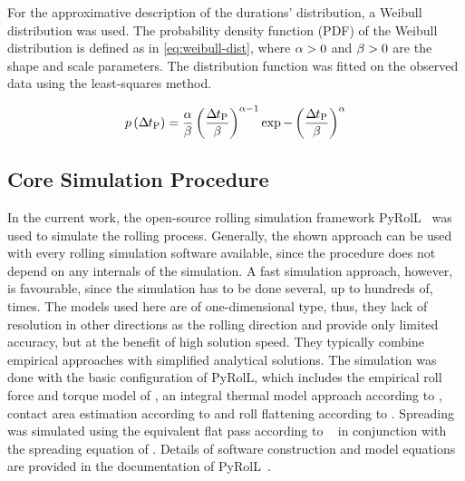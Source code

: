 For the approximative description of the durations' distribution, a Weibull distribution was used.
The probability density function (PDF) of the Weibull distribution is defined as in \autoref{eq:weibull-dist},
where ${\alpha} > 0$ and ${\beta} > 0$ are the shape and scale parameters.
The distribution function was fitted on the observed data using the least-squares method.

\begin{equation}
    p\left({{\Delta\mspace{-1mu}t}_\mathrm{P}} \right)=\frac{{\alpha}}{{\beta}} \left(\frac{{{\Delta\mspace{-1mu}t}_\mathrm{P}}}{{\beta}}\right)^{{\alpha}-1}\exp -\left(\frac{{{\Delta\mspace{-1mu}t}_\mathrm{P}}}{{\beta}} \right)^{{\alpha}}
    \label{eq:weibull-dist}
\end{equation}

\subsection{Core Simulation Procedure}\label{subsec:simulation-procedure}

In the current work, the open-source rolling simulation framework PyRolL~\cite{pyroll_jors, pyroll2.1} was used to simulate the rolling process.
Generally, the shown approach can be used with every rolling simulation software available, since the procedure does not depend on any internals of the simulation.
A fast simulation approach, however, is favourable, since the simulation has to be done several, up to hundreds of, times.
The models used here are of one-dimensional type, thus, they lack of resolution in other directions as the rolling direction and provide only limited accuracy, but at the benefit of high solution speed.
They typically combine empirical approaches with simplified analytical solutions.
The simulation was done with the basic configuration of PyRolL, which includes the empirical roll force and torque model of \textcite{Hensel1978}, an integral thermal model approach according to \textcite{Hensel1990}, contact area estimation according to \textcite{Zouhar1960} and roll flattening according to \textcite{Hitchcock1935}.
Spreading was simulated using the equivalent flat pass according to \citeauthor*{Lendl1948}~\cite{Lendl1948, Lendl1948a, Lendl1949} in conjunction with the spreading equation of \textcite{Wusatowski1969}.
Details of software construction and model equations are provided in the documentation of PyRolL~\cite{pyroll}.


